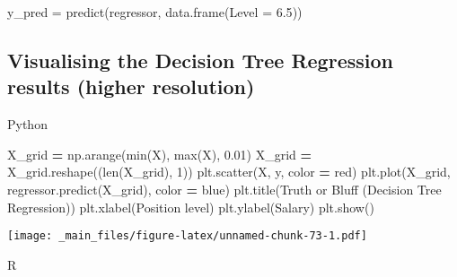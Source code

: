 \documentclass[
]{book}
\newenvironment{Shaded}{\begin{snugshade}}{\end{snugshade}}
\newcommand{\AttributeTok}[1]{\textcolor[rgb]{0.77,0.63,0.00}{#1}}
\newcommand{\BuiltInTok}[1]{#1}
\newcommand{\DecValTok}[1]{\textcolor[rgb]{0.00,0.00,0.81}{#1}}
\newcommand{\FloatTok}[1]{\textcolor[rgb]{0.00,0.00,0.81}{#1}}
\newcommand{\FunctionTok}[1]{\textcolor[rgb]{0.00,0.00,0.00}{#1}}
\newcommand{\NormalTok}[1]{#1}
\newcommand{\OperatorTok}[1]{\textcolor[rgb]{0.81,0.36,0.00}{\textbf{#1}}}
\newcommand{\OtherTok}[1]{\textcolor[rgb]{0.56,0.35,0.01}{#1}}
\newcommand{\StringTok}[1]{\textcolor[rgb]{0.31,0.60,0.02}{#1}}
\theoremstyle{definition}
\theoremstyle{definition}
\theoremstyle{definition}
\theoremstyle{definition}
\theoremstyle{remark}
\begin{document}
\begin{Shaded}
\begin{Highlighting}[]
\NormalTok{y\_pred }\OtherTok{=} \FunctionTok{predict}\NormalTok{(regressor, }\FunctionTok{data.frame}\NormalTok{(}\AttributeTok{Level =} \FloatTok{6.5}\NormalTok{))}
\end{Highlighting}
\end{Shaded}

\hypertarget{visualising-the-decision-tree-regression-results-higher-resolution}{%
\subsection{Visualising the Decision Tree Regression results (higher resolution)}\label{visualising-the-decision-tree-regression-results-higher-resolution}}

Python

\begin{Shaded}
\begin{Highlighting}[]
\NormalTok{X\_grid }\OperatorTok{=}\NormalTok{ np.arange(}\BuiltInTok{min}\NormalTok{(X), }\BuiltInTok{max}\NormalTok{(X), }\FloatTok{0.01}\NormalTok{)}
\NormalTok{X\_grid }\OperatorTok{=}\NormalTok{ X\_grid.reshape((}\BuiltInTok{len}\NormalTok{(X\_grid), }\DecValTok{1}\NormalTok{))}
\NormalTok{plt.scatter(X, y, color }\OperatorTok{=} \StringTok{\textquotesingle{}red\textquotesingle{}}\NormalTok{)}
\NormalTok{plt.plot(X\_grid, regressor.predict(X\_grid), color }\OperatorTok{=} \StringTok{\textquotesingle{}blue\textquotesingle{}}\NormalTok{)}
\NormalTok{plt.title(}\StringTok{\textquotesingle{}Truth or Bluff (Decision Tree Regression)\textquotesingle{}}\NormalTok{)}
\NormalTok{plt.xlabel(}\StringTok{\textquotesingle{}Position level\textquotesingle{}}\NormalTok{)}
\NormalTok{plt.ylabel(}\StringTok{\textquotesingle{}Salary\textquotesingle{}}\NormalTok{)}
\NormalTok{plt.show()}
\end{Highlighting}
\end{Shaded}

\texttt{[image: \_main\_files/figure-latex/unnamed-chunk-73-1.pdf]}

R
\end{document}

